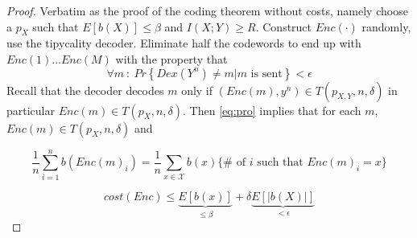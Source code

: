 \documentclass{article}
\theoremstyle{definition} %
\renewcommand{\Pr}[1]{Pr\left\{#1\right\}}
\newcommand{\Ex}[1]{E\left[#1\right]}
\def\X{\mathcal{X}}
\begin{document}
\begin{proof}
  Verbatim as the proof of the coding theorem without costs, namely choose a $p_X$ such that $\Ex{b(X)} \leq \beta$ and $I(X;Y) \geq R$. Construct $Enc(\cdot)$ randomly, use the tipycality decoder. Eliminate half the codewords to end up with $Enc(1) \dots Enc(M)$ with the property that
  \begin{equation}
    \label{eq:pro}
    \forall m~:~\Pr{Dex(Y^n) \not = m | m \text{ is sent}} < \epsilon
  \end{equation}
  Recall that the decoder decodes $m$ only if $(Enc(m), y^n) \in T(p_{X,Y}, n, \delta)$ in particular $Enc(m) \in T(p_X, n, \delta)$. Then \cref{eq:pro} implies that for each $m$, $Enc(m) \in T(p_X, n, \delta)$ and

  \[
    \frac 1 n \sum_{i=1}^n b(Enc(m)_i) = \frac 1 n \sum_{x\in \X} b(x) \{ \# \text{ of } i \text{ such that } Enc(m)_i = x\}
  \]

  \[
    cost(Enc) \leq \underbrace{\Ex{b(x)}}_{\leq \beta} + \delta \underbrace{\Ex{|b(X)|}}_{< \epsilon}
  \]
\end{proof}
\end{document}
